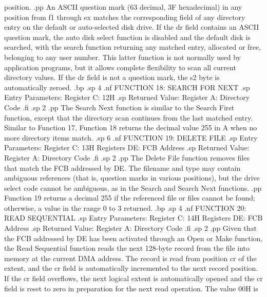 position.
.pp
An ASCII question mark (63 decimal, 3F hexadecimal) in any 
position from f1 through ex matches the corresponding field of 
any directory entry on the default or auto-selected disk drive.  
If the dr field contains an ASCII question mark, the auto disk 
select function is disabled and the default disk is searched, 
with the search function returning any matched entry, allocated 
or free, belonging to any user number.  This latter function is 
not normally used by application programs, but it allows complete 
flexibility to scan all current directory values.  If the dr 
field is not a question mark, the s2 byte is automatically 
zeroed.
.bp
.sp 4
.nf
                  FUNCTION 18:  SEARCH FOR NEXT
.sp
                 Entry Parameters:
                       Register C:  12H
.sp
                   Returned Value:
                      Register  A:  Directory Code
.fi
.sp 2
.pp
The Search Next function is similar to the Search First function, except
that the directory scan continues from the last matched entry.  
Similar to Function 17, Function 18 returns the decimal value 255 
in A when no more directory items match.
.sp 6
.nf
                    FUNCTION 19:  DELETE FILE
.sp
                Entry Parameters:
                      Register C:  13H
                    Registers DE:  FCB Address
.sp
                Returned Value:
                     Register  A:  Directory Code
.fi
.sp 2
.pp
The Delete File function removes files that match the FCB 
addressed by DE.  The filename and type may contain ambiguous 
references (that is, question marks in various positions), but the 
drive select code cannot be ambiguous, as in the Search and 
Search Next functions.
.pp
Function 19 returns a decimal 255 if the referenced file or files 
cannot be found; otherwise, a value in the range 0 to 3 returned.
.bp
.sp 4
.nf
                  FUNCTION 20:  READ SEQUENTIAL
.sp
               Entry Parameters:
                     Register C:  14H
                   Registers DE:  FCB Address
.sp
               Returned Value:
                    Register  A:  Directory Code
.fi
.sp 2
.pp
Given that the FCB addressed by DE has been activated through an 
Open or Make function, the Read Sequential function reads the 
next 128-byte record from the file into memory at the current DMA 
address.  The record is read from position cr of the extent, and 
the cr field is automatically incremented to the next record 
position.  If the cr field overflows, the next logical extent is 
automatically opened and the cr field is reset to zero in 
preparation for the next read operation.  The value 00H is 
